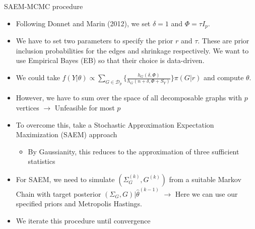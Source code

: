 \begin{frame}{SAEM-MCMC procedure}
    \begin{itemize}
        \item Following Donnet and Marin (2012), we set $\delta=1$ and $\Phi = \tau I_p$.
        \item We have to set two parameters to specify the prior $r$ and $\tau$. These are prior inclusion probabilities for the edges and shrinkage respectively. We want to use Empirical Bayes (EB) so that their choice is data-driven. 
        \item We could take $    f(Y|\theta) \propto \sum_{G \in \mathcal{D}_p} \{\frac{h_G(\delta, \Phi)}{h_G(n+\delta, \Phi + S_Y)}\}\pi(G|r)$ and compute $\theta$. 
        \item However, we have to sum over the space of all decomposable graphs with $p$ vertices $\rightarrow$ Unfeasible for most $p$
        \item To overcome this, take a Stochastic Approximation Expectation Maximization (SAEM) approach
        \begin{itemize}
            \item By Gaussianity, this reduces to the approximation of three sufficient statistics
        \end{itemize}
        \item For SAEM, we need to simulate $(\Sigma_G^{(k)}, G^{(k)})$ from a suitable Markov Chain with target posterior $(\Sigma_G, G)|\hat\theta^{(k-1)}$ $\rightarrow$ Here we can use our specified priors and Metropolis Hastings.
        \item We iterate this procedure until convergence
    \end{itemize} 
\end{frame}

